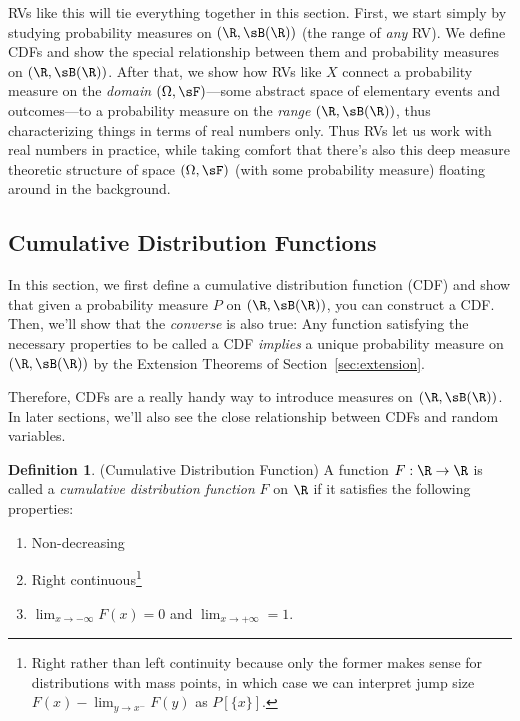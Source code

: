 \documentclass[12pt]{article}
\theoremstyle{plain}
\theoremstyle{definition}
\newtheorem{defn}[thm]{Definition}
\theoremstyle{remark}
\newcommand{\ra}{\rightarrow}
\begin{document}
RVs like this will tie everything together in this section.
First, we start simply by studying probability measures on
$(\R,\sB(\R))$ (the range of \emph{any} RV). We define CDFs and show the
special relationship between them and probability measures on
$(\R,\sB(\R))$.  After that, we show how RVs like $X$ connect a
probability measure on the \emph{domain} $(\Omega,\sF)$---some abstract
space of elementary events and outcomes---to a probability measure on
the \emph{range} $(\R,\sB(\R))$, thus characterizing things in terms of
real numbers only. Thus RVs let us work with real numbers in practice,
while taking comfort that there's also this deep measure theoretic
structure of space $(\Omega,\sF)$ (with some probability measure)
floating around in the background.


\subsection{Cumulative Distribution Functions}
\label{sec:cdf}

In this section, we first define a cumulative distribution function
(CDF) and show that given a probability measure $P$ on $(\R,\sB(\R))$,
you can construct a CDF. Then, we'll show that the \emph{converse} is
also true: Any function satisfying the necessary properties to be called
a CDF \emph{implies} a unique probability measure on $(\R,\sB(\R))$ by
the Extension Theorems of Section~\ref{sec:extension}.

Therefore, CDFs are a really handy way to introduce measures on
$(\R,\sB(\R))$. In later sections, we'll also see the close relationship
between CDFs and random variables.

\begin{defn}(Cumulative Distribution Function)
\label{defn:cdf}
A function $F:\R\ra\R$ is called a
\emph{cumulative distribution function} $F$ on $\R$ if it satisfies the
following properties:
\begin{enumerate}[label=(\roman*)]
  \item Non-decreasing
  \item Right continuous\footnote{%
      Right rather than left continuity because only the former makes
      sense for distributions with mass points, in which case we can
      interpret jump size $F(x)-\lim_{y\ra x^-}F(y)$ as $P[\{x\}]$.
    }
  \item $\lim_{x\ra-\infty} F(x)=0$ and $\lim_{x\ra+\infty}=1$.
\end{enumerate}
\end{defn}
\end{document}
